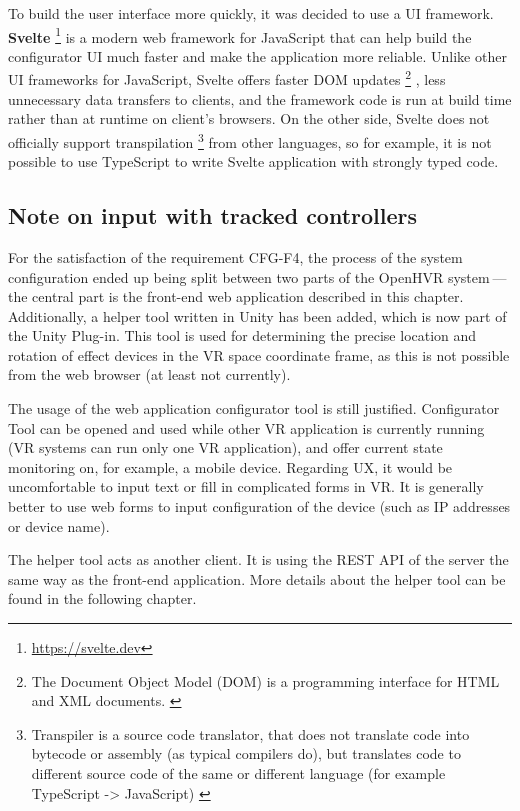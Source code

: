To build the user interface more quickly, it was decided to use a UI framework.
\textbf{Svelte} \footnote{\href{https://svelte.dev}{https://svelte.dev}} is a modern web framework for JavaScript
that can help build the configurator UI much faster and make the application
more reliable. Unlike other UI frameworks for JavaScript, Svelte offers
faster DOM updates
\footnote{The Document Object Model (DOM) is a programming interface for HTML and XML documents. \cite{dom}}
, less unnecessary data transfers
to clients, and the framework code is run at build time rather than at runtime on
client’s browsers. \cite{svelteblog} On the other side, Svelte does not officially
support transpilation
\footnote{Transpiler is a source code translator, that does not translate code into bytecode or assembly (as typical compilers do), but translates code to different source code of the same or different language (for example TypeScript -> JavaScript) \cite{sscd}}
from other languages, so for example, it is not possible
to use TypeScript to write Svelte application with strongly typed code.


\hypertarget{x-note-on-input-with-tracked-controllers}{\subsection{Note on input with tracked controllers}}
For the satisfaction of the requirement CFG-F4, the process of the system configuration
ended up being split between two parts of the OpenHVR system — the central part is the front-end web application described
in this chapter. Additionally, a helper tool written in Unity has been added,
which is now part of the Unity Plug-in. This tool is used for determining
the precise location and rotation of effect devices in the VR space
coordinate frame, as this is not possible from the web browser (at least
not currently).


The usage of the web application configurator tool is still justified.
Configurator Tool can be opened and used while other VR application is currently
running (VR systems can run only one VR application), and offer current state
monitoring on, for example, a mobile device. Regarding UX, it would be uncomfortable to
input text or fill in complicated forms in VR. It is generally better to use web forms to
input configuration of the device (such as IP addresses or device name).


The helper tool acts as another client. It is using the REST API of the server
the same way as the front-end application. More details about the helper tool
can be found in the following chapter.


